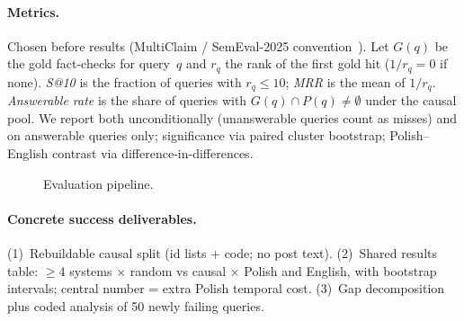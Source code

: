 \documentclass[11pt]{article}
\begin{document}
\paragraph{Metrics.}
Chosen before results (MultiClaim / SemEval-2025 convention~\cite{pikuliak2023multilingual,peng2025semeval}).
Let $G(q)$ be the gold fact-checks for query~$q$ and $r_q$ the rank of the first gold hit ($1/r_q=0$ if none).
\emph{S@10} is the fraction of queries with $r_q\le 10$; \emph{MRR} is the mean of $1/r_q$.
\emph{Answerable rate} is the share of queries with $G(q)\cap P(q)\ne\emptyset$ under the causal pool.
We report both unconditionally (unanswerable queries count as misses) and on answerable queries only; significance via paired cluster bootstrap; Polish--English contrast via difference-in-differences.

\begin{figure}[t]
\centering
{}
\caption{Evaluation pipeline.}
\label{fig:pipeline}
\end{figure}

\paragraph{Concrete success deliverables.}
(1)~Rebuildable causal split (id lists + code; no post text).
(2)~Shared results table: $\geq$4 systems $\times$ random vs causal $\times$ Polish and English, with bootstrap intervals; central number = extra Polish temporal cost.
(3)~Gap decomposition plus coded analysis of 50 newly failing queries.
\end{document}
